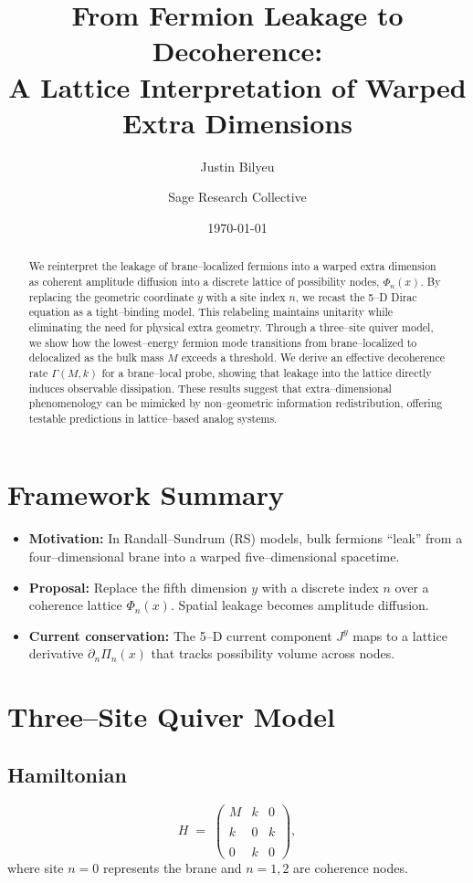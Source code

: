 \documentclass[11pt]{article}
\title{From Fermion Leakage to Decoherence:\\ A Lattice Interpretation of Warped Extra Dimensions}
\author[1]{Justin Bilyeu}
\author[2]{Sage Research Collective}
\affil[1]{\texttt{justin@example.com}}
\affil[2]{\texttt{sage@example.com}}
\date{\today}
\begin{document}
\maketitle

\begin{abstract}
We reinterpret the leakage of brane--localized fermions into a warped extra
dimension as coherent amplitude diffusion into a discrete lattice of
possibility nodes, $\Phi_n(x)$.  By replacing the geometric coordinate $y$
with a site index $n$, we recast the 5--D Dirac equation as a tight--binding
model.  This relabeling maintains unitarity while eliminating the need for
physical extra geometry.  Through a three--site quiver model, we show how the
lowest--energy fermion mode transitions from brane--localized to delocalized
as the bulk mass $M$ exceeds a threshold.  We derive an effective decoherence
rate $\Gamma(M,k)$ for a brane--local probe, showing that leakage into the
lattice directly induces observable dissipation.  These results suggest that
extra--dimensional phenomenology can be mimicked by non--geometric information
redistribution, offering testable predictions in lattice--based analog
systems.
\end{abstract}

\section{Framework Summary}
\begin{itemize}
    \item \textbf{Motivation:} In Randall--Sundrum (RS) models, bulk fermions
    ``leak'' from a four--dimensional brane into a warped five--dimensional
    spacetime.
    \item \textbf{Proposal:} Replace the fifth dimension $y$ with a discrete
    index $n$ over a coherence lattice $\Phi_n(x)$.  Spatial leakage becomes
    amplitude diffusion.
    \item \textbf{Current conservation:} The 5--D current component $J^{y}$
    maps to a lattice derivative $\partial_n \Pi_n(x)$ that tracks possibility
    volume across nodes.
\end{itemize}

\section{Three--Site Quiver Model}
\subsection{Hamiltonian}
\[
H \;=\;
\begin{pmatrix}
M & k & 0 \\\\
k & 0 & k \\\\
0 & k & 0
\end{pmatrix},
\]
where site $n=0$ represents the brane and $n=1,2$ are coherence nodes.
\end{document}
